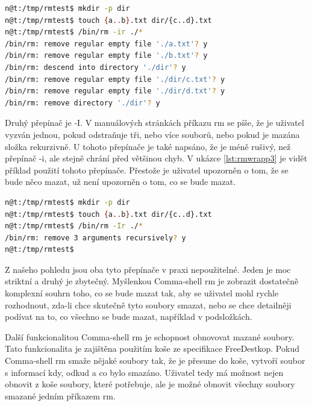 \documentclass[thesis=M,czech]{FITthesis}[2012/06/26]
\begin{document}
\begin{minipage}{\linewidth}
\begin{lstlisting}[language=bash, caption={rm}, label={lst:rmwrapp2}]
n@t:/tmp/rmtest$ mkdir -p dir
n@t:/tmp/rmtest$ touch {a..b}.txt dir/{c..d}.txt
n@t:/tmp/rmtest$ /bin/rm -ir ./*
/bin/rm: remove regular empty file './a.txt'? y
/bin/rm: remove regular empty file './b.txt'? y
/bin/rm: descend into directory './dir'? y
/bin/rm: remove regular empty file './dir/c.txt'? y
/bin/rm: remove regular empty file './dir/d.txt'? y
/bin/rm: remove directory './dir'? y
\end{lstlisting}
\end{minipage}

Druhý přepínač je -I. V manuálových stránkách příkazu rm se píše, že je uživatel vyzván jednou, pokud odstraňuje tři, nebo více souborů, nebo pokud je mazána složka rekurzivně. U tohoto přepínače je také napsáno, že je méně rušivý, než přepínač -i, ale stejně chrání před většinou chyb. V ukázce \ref{lst:rmwrapp3} je vidět příklad použití tohoto přepínače. Přestože je uživatel upozorněn o tom, že se bude něco mazat, už není upozorněn o tom, co se bude mazat.

\begin{minipage}{\linewidth}
\begin{lstlisting}[language=bash, caption={rm s }, label={lst:rmwrapp3}]
n@t:/tmp/rmtest$ mkdir -p dir
n@t:/tmp/rmtest$ touch {a..b}.txt dir/{c..d}.txt
n@t:/tmp/rmtest$ /bin/rm -Ir ./*
/bin/rm: remove 3 arguments recursively? y
n@t:/tmp/rmtest$
\end{lstlisting}
\end{minipage}

Z našeho pohledu jsou oba tyto přepínače v praxi nepoužitelné. Jeden je moc striktní a druhý je zbytečný. Myšlenkou Comma-shell rm je zobrazit dostatečně komplexní souhrn toho, co se bude mazat tak, aby se uživatel mohl rychle rozhodnout, zda-li chce skutečně tyto soubory smazat, nebo se chce detailněji podívat na to, co všechno se bude mazat, například v podsložkách.

Další funkcionalitou Comma-shell rm je schopnost obnovovat mazané soubory. Tato funkcionalita je zajištěna použitím koše ze specifikace FreeDestkop. Pokud Comma-shell rm smaže nějaké soubory tak, že je přesune do koše, vytvoří soubor s informací kdy, odkud a co bylo smazáno. Uživatel tedy má možnost nejen obnovit z koše soubory, které potřebuje, ale je možné obnovit všechny soubory smazané jedním příkazem rm.
\end{document}
